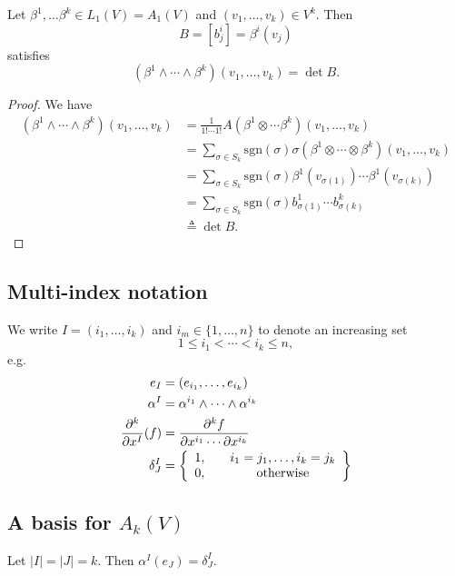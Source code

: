 \begin{lemma}
Let $\beta^1, \dots \beta^k \in L_1(V) = A_1(V)$ and
$(v_1, \dots, v_k) \in V^k$. Then
$$
B = [b_j^i] = \beta^i(v_j)
$$
satisfies
$$
  (\beta^1 \wedge \cdots \wedge \beta^k)(v_1, \dots, v_k)
= \det B.
$$
\end{lemma}
\begin{proof}
We have
\begin{align*}
   (\beta^1 \wedge \cdots \wedge \beta^k)(v_1, \dots, v_k)
&= \frac{1}{1! \cdots 1!}
   A(\beta^1 \otimes \cdots \beta^k)(v_1, \dots, v_k) \\
&= \sum_{\sigma \in S_k}
     \mathrm{sgn}(\sigma)
     \sigma(\beta^1 \otimes \cdots \otimes \beta^k)
       (v_1, \dots, v_k) \\
&= \sum_{\sigma \in S_k}
     \mathrm{sgn}(\sigma)
     \beta^1(v_{\sigma(1)}) \cdots \beta^1(v_{\sigma(k)}) \\
&= \sum_{\sigma \in S_k}
     \mathrm{sgn}(\sigma)
     b^1_{\sigma(1)} \cdots b^k_{\sigma(k)} \\
&\triangleq \det B.
\end{align*}
\end{proof}

\subsection*{Multi-index notation}
We write $I = (i_1, \dots, i_k)$ and $i_m \in \{1, \dots, n\}$ to
denote an increasing set
$$
1 \leq i_1 < \cdots < i_k \leq n,
$$
e.g.
\begin{align*}
   e_I
&= (e_{i_1}, \dots, e_{i_k}) \\
   \alpha^I
&= \alpha^{i_1} \wedge \cdots \wedge \alpha^{i_k} \\
   \frac{\partial^k}{\partial x^I}(f)
&= \frac{\partial^k f}
        {\partial x^{i_1} \cdots \partial x^{i_k}} \\
   \delta^{I}_J
&= \left\{
     \begin{array}{c c}
       1, & \quad i_1 = j_1, \dots, i_k = j_k \\
       0, & \quad \text{otherwise}
     \end{array}
   \right\}
\end{align*}

\subsection*{A basis for $A_k(V)$}

\begin{lemma}
Let $|I| = |J| = k$. Then $\alpha^I(e_J) = \delta^I_J$.
\end{lemma}

